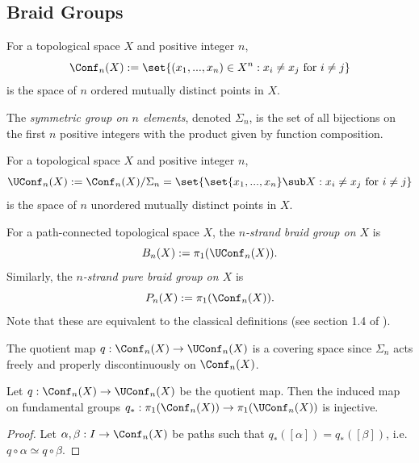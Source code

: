 \subsection{Braid Groups}\label{sec:bg-braid-groups}

\begin{definition}
    For a topological space $X$ and positive integer $n$,
    \[
        \Conf_n(X) := \set{(x_1,...,x_n) \in X^n : x_i \neq x_j \text{ for } i \neq j}
    \]
    is the space of $n$ ordered mutually distinct points in $X$.
\end{definition}

\begin{definition}
    The \emph{symmetric group on $n$ elements}, denoted $\Sigma_n$, is the set of all bijections on the first $n$ positive integers with the product given by function composition.
\end{definition}

\begin{definition}
    For a topological space $X$ and positive integer $n$,
    \[
        \UConf_n(X) := \Conf_n(X) / \Sigma_n = \set{\set{x_1,...,x_n} \sub X : x_i \neq x_j \text{ for } i \neq j}
    \]
    is the space of $n$ unordered mutually distinct points in $X$.
\end{definition}

\begin{definition}
    For a path-connected topological space $X$, the \emph{$n$-strand braid group on $X$} is
    \[
        B_n(X) := \pi_1(\UConf_n(X)).
    \]
    Similarly, the \emph{$n$-strand pure braid group on $X$} is
    \[
        P_n(X) := \pi_1(\Conf_n(X)).
    \]
    Note that these are equivalent to the classical definitions (see section 1.4 of \cite{kassel2008braid}).
\end{definition}

\begin{remark}
    The quotient map $q : \Conf_n(X) \to \UConf_n(X)$ is a covering space since $\Sigma_n$ acts freely and properly discontinuously on $\Conf_n(X)$.
\end{remark}

\begin{lemma}
    Let $q : \Conf_n(X) \to \UConf_n(X)$ be the quotient map.
    Then the induced map on fundamental groups $q_* : \pi_1(\Conf_n(X)) \to \pi_1(\UConf_n(X))$ is injective.
    \begin{proof}
        Let $\alpha, \beta : I \to \Conf_n(X)$ be paths such that $q_*([\alpha]) = q_*([\beta])$, i.e. $q \circ \alpha \simeq q \circ \beta$.
    \end{proof}
\end{lemma}